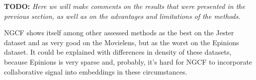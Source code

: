 \textbf{TODO: }
\textit{Here we will make comments on the results that were presented in the previous section, as well as on the advantages and limitations of the methods.}



NGCF shows itself among other assessed methods as the best on the Jester dataset 
and as very good on the Movielens, but as the worst on the Epinions dataset.
It could be explained with differences in density of these datasets, because
Epinions is very sparse and, probably, it's hard for NGCF to incorporate 
collaborative signal into embeddings in these circumstances.



